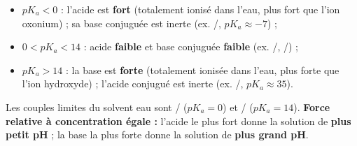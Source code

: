 \documentclass[11pt]{article}
\begin{document}
\begin{propriete}
\begin{itemize}
\item $pK_a < 0$ : l'acide est \textbf{fort} (totalement ionisé dans l'eau, plus fort que l'ion oxonium) ; sa base conjuguée est inerte (ex. /, $pK_a \approx -7$) ;
\item $0 < pK_a < 14$ : acide \textbf{faible} et base conjuguée \textbf{faible} (ex. /, /) ;
\item $pK_a > 14$ : la base est \textbf{forte} (totalement ionisée dans l'eau, plus forte que l'ion hydroxyde) ; l'acide conjugué est inerte (ex. /, $pK_a \approx 35$).
\end{itemize}
Les couples limites du solvent eau sont / ($pK_a = 0$) et / ($pK_a = 14$).
\textbf{Force relative à concentration égale :} l'acide le plus fort donne la solution de \textbf{plus petit pH} ; la base la plus forte donne la solution de \textbf{plus grand pH}.
\end{propriete}
\end{document}
